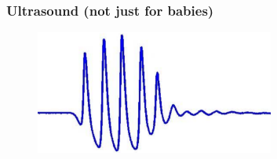 \begin{frame}
  \frametitle{Ultrasound (not just for babies)}
  \begin{figure}
    \centering
    \includegraphics[width=0.7\textwidth]{./figs/ultrasound_example}
  \end{figure}
\end{frame}

% 
% 
